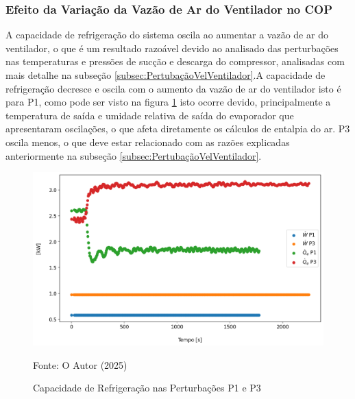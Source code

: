 \subsubsection{Efeito da Variação da Vazão de Ar do Ventilador no COP}

A capacidade de refrigeração do sistema oscila ao aumentar a vazão de ar do ventilador, o que é um resultado razoável devido ao analisado das perturbações nas temperaturas e pressões de sucção e descarga do compressor, analisadas com mais detalhe na subseção \ref{subsec:PertubaçãoVelVentilador}.A capacidade de refrigeração decresce e oscila com o aumento da vazão de ar do ventilador isto é para P1, como pode ser visto na figura \ref{fig:Qe e W Perturbação Ventilador} isto ocorre devido, principalmente a temperatura de saída e umidade relativa de saída do evaporador que apresentaram oscilações, o que afeta diretamente os cálculos de entalpia do ar. P3 oscila menos, o que deve estar relacionado com as razões explicadas anteriormente na subseção \ref{subsec:PertubaçãoVelVentilador}.

\begin{figure}[h]
    \centering
    \includegraphics[width=1\linewidth]{FigurasdoTexto/Qe e W Perturbação Ventilador.png}
    \caption{Capacidade de Refrigeração nas Perturbações P1 e P3}
    \label{fig:Qe e W Perturbação Ventilador}
    {\footnotesize Fonte: O Autor (2025)}
\end{figure}

